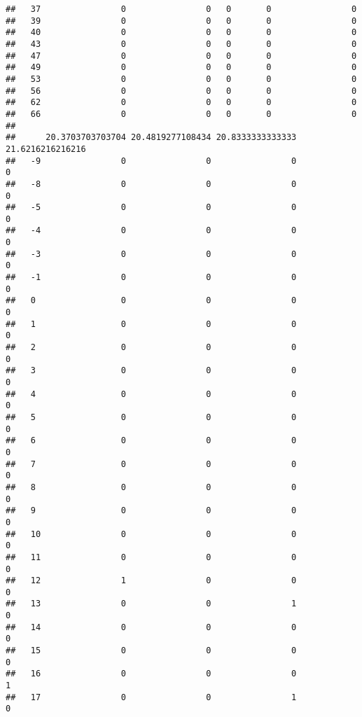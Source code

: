 \documentclass[]{article}
\begin{document}
\begin{verbatim}
##   37                0                0   0       0                0
##   39                0                0   0       0                0
##   40                0                0   0       0                0
##   43                0                0   0       0                0
##   47                0                0   0       0                0
##   49                0                0   0       0                0
##   53                0                0   0       0                0
##   56                0                0   0       0                0
##   62                0                0   0       0                0
##   66                0                0   0       0                0
##     
##      20.3703703703704 20.4819277108434 20.8333333333333 21.6216216216216
##   -9                0                0                0                0
##   -8                0                0                0                0
##   -5                0                0                0                0
##   -4                0                0                0                0
##   -3                0                0                0                0
##   -1                0                0                0                0
##   0                 0                0                0                0
##   1                 0                0                0                0
##   2                 0                0                0                0
##   3                 0                0                0                0
##   4                 0                0                0                0
##   5                 0                0                0                0
##   6                 0                0                0                0
##   7                 0                0                0                0
##   8                 0                0                0                0
##   9                 0                0                0                0
##   10                0                0                0                0
##   11                0                0                0                0
##   12                1                0                0                0
##   13                0                0                1                0
##   14                0                0                0                0
##   15                0                0                0                0
##   16                0                0                0                1
##   17                0                0                1                0

\end{verbatim}
\end{document}
